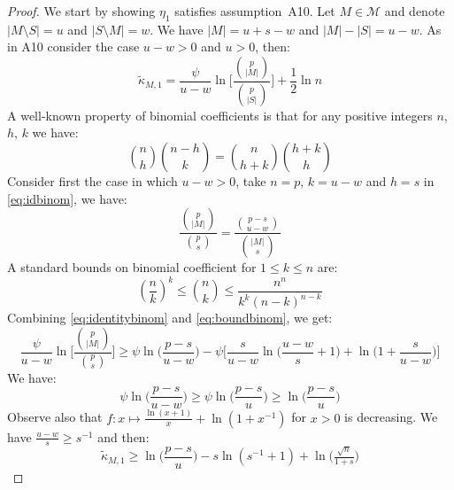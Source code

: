 \documentclass[aos]{imsart}
\theoremstyle{plain}
\newcommand{\M}{\mathcal{M}}
\begin{document}
\begin{proof}
    We start by showing $\eta_1$ satisfies assumption~A10. Let $M\in\M$ and denote $|M\setminus S|=u$ and $|S\setminus M|=w$. We have $|M|=u+s-w$ and $|M|-|S|=u-w$. As in A10 consider the case $u-w>0$ and $u>0$, then:
    \begin{equation*}
        \tilde{\kappa}_{M,1}=\frac{\psi}{u-w}\ln\bigg[\frac{\binom{p}{|M|}}{\binom{p}{|S|}}\bigg]+ \frac{1}{2}\ln n
    \end{equation*}
    A well-known property of binomial coefficients is that for any positive integers $n$, $h$, $k$ we have:
    \begin{equation}\label{eq:idbinom}
        \binom{n}{h}\binom{n-h}{k}=\binom{n}{h+k}\binom{h+k}{h}
    \end{equation}
    Consider first the case in which $u-w>0$, take $n=p$, $k=u-w$ and $h=s$ in \eqref{eq:idbinom}, we have:
    \begin{equation}\label{eq:identitybinom}
        \frac{\binom{p}{|M|}}{\binom{p}{s}}=
        \frac{\binom{p -s}{u-w}}{\binom{|M|}{s}}
    \end{equation}
A standard bounds on binomial coefficient for $1\leq k\leq n$ are:
\begin{equation}\label{eq:boundbinom}
  \left(\frac{n}{k}\right)^k \leq  \binom{n}{k} \leq \frac{n^n}{k^k(n-k)^{n-k}}
\end{equation}
Combining \eqref{eq:identitybinom} and \eqref{eq:boundbinom}, we get:
$$ \frac{\psi}{u-w}\ln\bigg[\frac{\binom{p}{|M|}}{\binom{p}{s}}\bigg] \geq \psi\ln\bigg(\frac{p-s}{u-w}\bigg)-\psi\bigg[\frac{s}{u-w}\ln\bigg(\frac{u-w}{s}+1\bigg) +\ln\bigg(1+\frac{s}{u-w}\bigg) \bigg]$$
We have:
$$\psi\ln\bigg(\frac{p-s}{u-w}\bigg) \geq \psi\ln\bigg(\frac{p-s}{u}\bigg) \geq \ln\bigg(\frac{p-s}{u}\bigg)$$
Observe also that $f:x \mapsto \frac{\ln(x+1)}{x}+\ln(1+{x}^{-1})$ for $x>0$ is decreasing. We have $\frac{u-w}{s} \geq s^{-1}$ and then: 
\begin{equation}\label{eq:lowerboundb1ebic2}
        \tilde{\kappa}_{M,1} \geq \ln\big(\frac{p-s}{u}\big)-s\ln(s^{-1}+1)+ \ln \big(\tfrac{\sqrt{n}}{1+s}\big)

\end{equation}
\end{proof}
\end{document}

